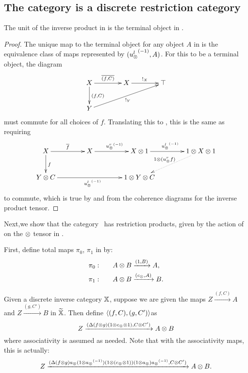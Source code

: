 \subsection{The category \hypXt is a discrete restriction category} %
\label{sub:the_category_hypxt_is_cartesian}



\begin{lemma}\label{lem:tensor_unit_of_x_is_terminal_object_of_xt}
  The unit of the inverse product in \X is the terminal object in \Xt.
\end{lemma}
\begin{proof}
  The unique map to the terminal object for any object $A$ in \Xt is the equivalence class of maps
  represented by $({u_{\otimes}^l}^{(-1)},A)$. For this to be a terminal object, the diagram
  \[
    \xymatrix @C=40pt @R=25pt{
      X \ar[r]^{\restr{(f,C)}} \ar[d]^{(f,C)} & X \ar[r]^{!_X}  &\top  \\
      Y \ar[urr]_{!_Y}
    }
  \]
  must commute for all choices of $f$. Translating this to \X, this is the same as requiring
  \[
    \xymatrix @C=40pt @R=25pt{
      X \ar[r]^{\restr{f}} \ar[d]^{f} & X \ar[r]^{\inv{\usr} }
      & X\*1 \ar[r]^{\inv{\usl}}  &1\*X\*1 \ar@{.>}[dl]_{1\*(\usr f)}  \\
      Y \*C\ar[rr]_{\inv{\usl}} & & 1 \*Y \* C
    }
  \]
  to commute, which is true by \rone and from the coherence diagrams for the inverse product tensor.
\end{proof}

Next,we show that the category \Xt\ has restriction products, given by the action of \wtc on
the $\otimes$ tensor in \X.

First, define total maps $\pi_0$, $\pi_1$ in \Xt by:
\begin{align}
  \pi_0:\qquad & A \otimes B \xrightarrow{(1,B)} A, \label{eq:defn:pia}\\
  \pi_1:\qquad & A \otimes B \xrightarrow{(c_{\otimes},A)} B. \label{eq:defn:pib}
\end{align}

\begin{definition}\label{def:product_map_in_xt}
  Given a discrete inverse category $\mathbb{X}$, suppose we are given the maps $ Z \xrightarrow{(f,C)} A$
  and $Z \xrightarrow{(g,C')} B$ in $\widetilde{\mathbb{X}}$. Then define $\langle(f,C),(g,C')\rangle$as
  \begin{equation}
    Z\xrightarrow{(\Delta  ( f \otimes g )  (1\otimes c_{\otimes} \otimes 1), C\otimes C')} A \otimes B\label{eq:defn:fg}
  \end{equation}
  where associativity is assumed as needed. Note that with the associativity maps, this is actually:
  \begin{equation}
    Z\xrightarrow{(\Delta  ( f \otimes g )  a_{\otimes} (1\otimes{a_{\otimes}}^{(-1)})
      (1\otimes (c_{\otimes} \otimes 1)) (1\otimes a_{\otimes}) {a_{\otimes}}^{(-1)}, C\otimes C')} A \otimes B.\label{eq:defn:fg2}
  \end{equation}
\end{definition}

